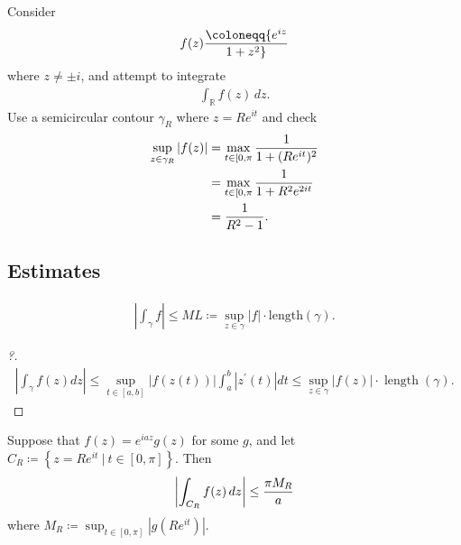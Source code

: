 \begin{example}[?]

Consider
\begin{align*}
f(z) \coloneqq{e^{iz} \over 1 + z^2}
\end{align*}
where \(z\neq \pm i\), and attempt to integrate
\begin{align*}
\int_{\mathbb{R}}f(z) \,dz
.\end{align*}
Use a semicircular contour \(\gamma_R\) where \(z = Re^{it}\) and check
\begin{align*}
\sup_{z\in \gamma_R} {\left\lvert {f(z)} \right\rvert} 
&= \max_{t\in [0, \pi} {1 \over 1 + (Re^{it})^2 } \\
&= \max_{t\in [0, \pi} {1 \over 1 + R^2e^{2it} } \\
&= {1\over R^2 - 1}
.\end{align*}

\end{example}

\hypertarget{estimates}{%
\subsection{Estimates}\label{estimates}}

\begin{proposition}

\begin{align*}
{\left\lvert { \int_\gamma f} \right\rvert} \leq ML \coloneqq\sup_{z\in \gamma} {\left\lvert {f} \right\rvert} \cdot \mathrm{length}(\gamma)
.\end{align*}

\end{proposition}

\begin{proof}[?]

\begin{align*}
\left|\int_{\gamma} f(z) d z\right| \leq \sup _{t \in[a, b]}|f(z(t))| \int_{a}^{b}\left|z^{\prime}(t)\right| d t \leq \sup _{z \in \gamma}|f(z)| \cdot \operatorname{length}(\gamma)
.\end{align*}

\end{proof}

\begin{proposition}

Suppose that \(f(z) = e^{iaz}g(z)\) for some \(g\), and let
\(C_R \coloneqq\left\{{ z=Re^{it} {~\mathrel{\Big|}~}t\in [0, \pi] }\right\}\).
Then
\begin{align*}
{\left\lvert {\int_{C_R} f(z) \,dz} \right\rvert} \leq {\pi M_R \over a}
\end{align*}
where
\(M_R \coloneqq\sup_{t\in [0, \pi]} {\left\lvert {g(Re^{it})} \right\rvert}\).

\end{proposition}

